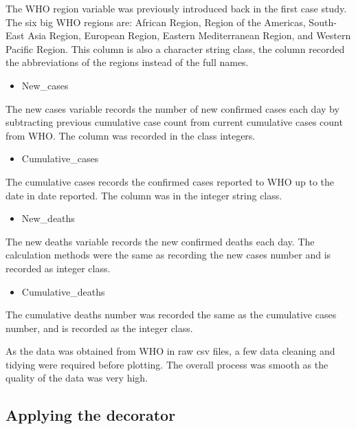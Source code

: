 \documentclass[
]{article}
\providecommand{\tightlist}{%
  \setlength{\itemsep}{0pt}\setlength{\parskip}{0pt}}
\begin{document}
The WHO region variable was previously introduced back in the first case
study. The six big WHO regions are: African Region, Region of the
Americas, South-East Asia Region, European Region, Eastern Mediterranean
Region, and Western Pacific Region. This column is also a character
string class, the column recorded the abbreviations of the regions
instead of the full names.

\begin{itemize}
\tightlist
\item
  New\_cases
\end{itemize}

The new cases variable records the number of new confirmed cases each
day by subtracting previous cumulative case count from current
cumulative cases count from WHO. The column was recorded in the class
integers.

\begin{itemize}
\tightlist
\item
  Cumulative\_cases
\end{itemize}

The cumulative cases records the confirmed cases reported to WHO up to
the date in date reported. The column was in the integer string class.

\begin{itemize}
\tightlist
\item
  New\_deaths
\end{itemize}

The new deaths variable records the new confirmed deaths each day. The
calculation methods were the same as recording the new cases number and
is recorded as integer class.

\begin{itemize}
\tightlist
\item
  Cumulative\_deaths
\end{itemize}

The cumulative deaths number was recorded the same as the cumulative
cases number, and is recorded as the integer class.

As the data was obtained from WHO in raw csv files, a few data cleaning
and tidying were required before plotting. The overall process was
smooth as the quality of the data was very high.

\hypertarget{applying-the-decorator}{%
\subsection{Applying the decorator}\label{applying-the-decorator}}
\end{document}
